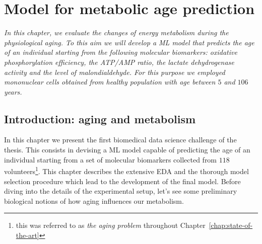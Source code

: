 
\chapter{Model for metabolic age prediction} \label{chap:frassoni}


\begin{displayquote}
	\textit{In this chapter, we evaluate the changes of energy metabolism during the physiological aging. To this aim we will develop a ML model that predicts the age of an individual starting from the following molecular biomarkers: oxidative phosphorylation efficiency, the \ac{ATP}/\ac{AMP} ratio, the lactate dehydrogenase activity and the level of malondialdehyde.  For this purpose we employed mononuclear cells obtained from healthy population with age between $5$ and $106$ years.} 
\end{displayquote}

\section{Introduction: aging and metabolism} \label{sec:frassoni_intro}

In this chapter we present the first biomedical data science challenge of the thesis.
This consists in devising a ML model capable of predicting the age of an individual starting from a set of molecular biomarkers collected from $118$ volunteers\footnote{this was referred to as \textit{the aging problem} throughout Chapter~\ref{chap:state-of-the-art}}.
This chapter describes the extensive EDA and the thorough model selection procedure which lead to the development of the final model.
Before diving into the details of the experimental setup, let's see some preliminary biological notions of how aging influences our metabolism.

